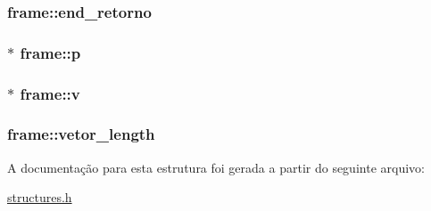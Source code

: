 \subsubsection[{\texorpdfstring{end\+\_\+retorno}{end_retorno}}]{ frame\+::end\+\_\+retorno}\hypertarget{structframe_a5d2f3ff696847f4147ff799395a331fc}{}\label{structframe_a5d2f3ff696847f4147ff799395a331fc}
\subsubsection[{\texorpdfstring{p}{p}}]{$\ast$ frame\+::p}\hypertarget{structframe_a6aa3e7c39989aa1477fd946643f521fe}{}\label{structframe_a6aa3e7c39989aa1477fd946643f521fe}
\subsubsection[{\texorpdfstring{v}{v}}]{$\ast$ frame\+::v}\hypertarget{structframe_a01ae11b1517de21c420c3c9a6a267401}{}\label{structframe_a01ae11b1517de21c420c3c9a6a267401}
\subsubsection[{\texorpdfstring{vetor\+\_\+length}{vetor_length}}]{ frame\+::vetor\+\_\+length}\hypertarget{structframe_aec98a2c044409e921f45ac926ace588e}{}\label{structframe_aec98a2c044409e921f45ac926ace588e}


A documentação para esta estrutura foi gerada a partir do seguinte arquivo\+:\begin{DoxyCompactItemize}
\item 
\hyperlink{structures_8h}{structures.\+h}\end{DoxyCompactItemize}
